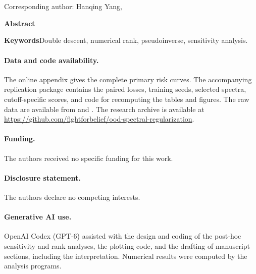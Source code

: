 \documentclass[12pt,letterpaper]{article}
\begin{document}
\begin{center}
{\Large\bfseries \ArticleTitle\par}
\ifdefined\Anonymous\else
\medskip
\Authors\\
\Affiliation\\
Corresponding author: Hanqing Yang, \href{mailto:\Correspondence}{\Correspondence}
\fi
\end{center}
\noindent\textbf{Abstract}\par
\noindent\par
\smallskip
\noindent\textbf{Keywords}\quad Double descent, numerical rank, pseudoinverse, sensitivity analysis.
\clearpage
\let\cite\citep


\paragraph{Data and code availability.} The online appendix gives the complete primary risk curves. The accompanying replication package contains the paired losses, training seeds, selected spectra, cutoff-specific scores, and code for recomputing the tables and figures. The raw data are available from \citet{year} and \citet{superdata}.
\ifdefined\Anonymous\else The research archive is available at \url{https://github.com/fightforbelief/ood-spectral-regularization}.\fi
\paragraph{Funding.} The authors received no specific funding for this work.
\paragraph{Disclosure statement.} The authors declare no competing interests.
\paragraph{Generative AI use.} OpenAI Codex (GPT-6) assisted with the design and coding of the post-hoc sensitivity and rank analyses, the plotting code, and the drafting of manuscript sections, including the interpretation. Numerical results were computed by the analysis programs.

\end{document}
